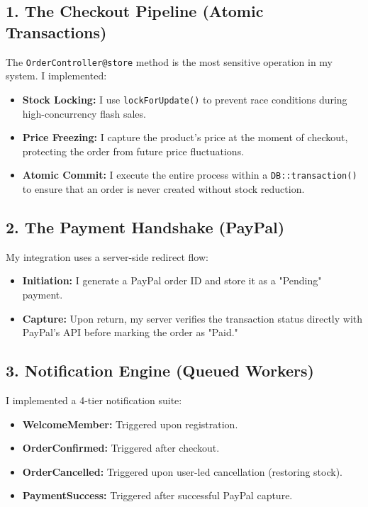 \documentclass[12pt,a4paper]{article}
\begin{document}
\subsection{1. The Checkout Pipeline (Atomic Transactions)}
The \texttt{OrderController@store} method is the most sensitive operation in my system. I implemented:
\begin{itemize}
    \item \textbf{Stock Locking:} I use \texttt{lockForUpdate()} to prevent race conditions during high-concurrency flash sales.
    \item \textbf{Price Freezing:} I capture the product's price at the moment of checkout, protecting the order from future price fluctuations.
    \item \textbf{Atomic Commit:} I execute the entire process within a \texttt{DB::transaction()} to ensure that an order is never created without stock reduction.
\end{itemize}

\subsection{2. The Payment Handshake (PayPal)}
My integration uses a server-side redirect flow:
\begin{itemize}
    \item \textbf{Initiation:} I generate a PayPal order ID and store it as a "Pending" payment.
    \item \textbf{Capture:} Upon return, my server verifies the transaction status directly with PayPal's API before marking the order as "Paid."
\end{itemize}

\subsection{3. Notification Engine (Queued Workers)}
I implemented a 4-tier notification suite:
\begin{itemize}
    \item \textbf{WelcomeMember:} Triggered upon registration.
    \item \textbf{OrderConfirmed:} Triggered after checkout.
    \item \textbf{OrderCancelled:} Triggered upon user-led cancellation (restoring stock).
    \item \textbf{PaymentSuccess:} Triggered after successful PayPal capture.
\end{itemize}
\end{document}
